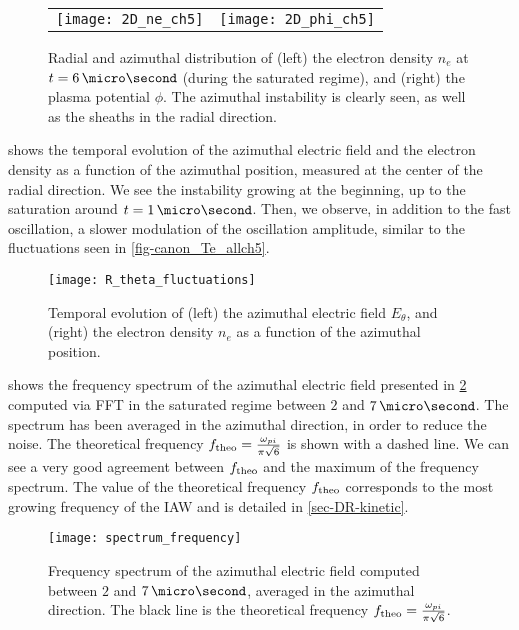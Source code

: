    \begin{figure}[hbtp]
      \centering
      \begin{tabular}{@{} c c @{}}
        \texttt{[image: 2D\_ne\_ch5]} &
        \texttt{[image: 2D\_phi\_ch5]} \\
      \end{tabular}
      \caption{Radial and azimuthal distribution of (left) the electron density $n_e$ at $t=6\,\micro\second$ (during the saturated regime), and (right) the plasma potential $\phi$. The azimuthal instability is clearly seen, as well as the sheaths in the radial direction. }
      \label{fig-2D_ne}
    \end{figure}
    
     shows the temporal evolution of the azimuthal electric field and the electron density as a function of the azimuthal position, measured at the center of the radial direction.
    We see the instability growing at the beginning, up to the saturation around $t=1\,\micro\second$.
    Then, we observe, in addition to the fast oscillation, a slower modulation of the oscillation amplitude, similar to the fluctuations seen in \cref{fig-canon_Te_allch5}.
    \begin{figure}[!hbt]
      \centering
      \texttt{[image: R\_theta\_fluctuations]}
      \caption{Temporal evolution of (left) the azimuthal electric field $E_{\theta}$, and (right) the electron density $n_e$ as a function of the azimuthal position.}
      \label{fig-2DcutEx}
    \end{figure}

     shows the frequency spectrum of the azimuthal electric field presented in \cref{fig-2DcutEx} computed via \ac{FFT} in the saturated regime between $2$ and $7\,\micro\second$.
    The spectrum has been averaged in the azimuthal direction, in order to reduce the noise.
    The theoretical frequency $f_{\rm theo} = \frac{\omega_{pi}}{\pi \sqrt{6} }$ \citep{croes2018} is shown with a dashed line. 
    We can see a very good agreement between $f_{\rm theo}$ and the maximum of the frequency spectrum.
    The value of the theoretical frequency $f_{\rm theo}$ corresponds to the most growing frequency of the \ac{IAW} and is detailed in \cref{sec-DR-kinetic}.
    \begin{figure}[!hbt]
      \centering
      \texttt{[image: spectrum\_frequency]}
      \caption{Frequency spectrum of the azimuthal electric field computed between $2$ and $7\,\micro\second$, averaged in the azimuthal direction. The black line is the theoretical frequency $f_{\rm theo} = \frac{\omega_{pi}}{\pi \sqrt{6} }$.}
      \label{fig-FFT_ex}
    \end{figure}
    
